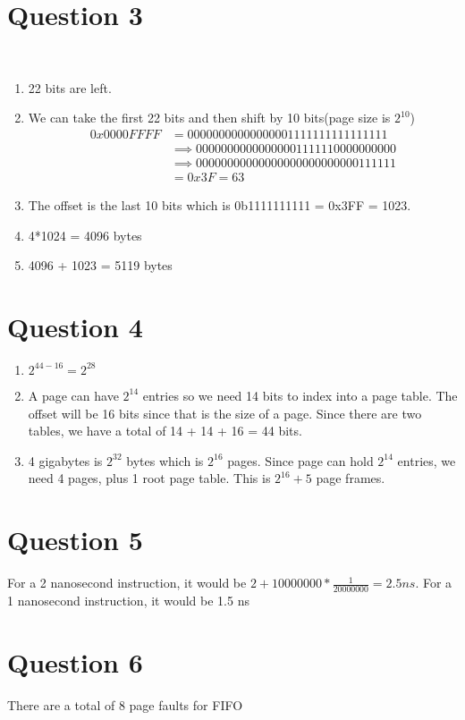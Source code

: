 \documentclass{article}
\begin{document}
\section*{Question 3}\
\begin{enumerate}
    \item 22 bits are left.
    \item We can take the first 22 bits and then shift by 10 bits(page size is $2^{10}$)
    \begin{align*}
        0x0000FFFF &= 0000 0000 0000 0000 1111 1111 1111 1111 \\
        &\implies     0000 0000 0000 0000 1111 1100 0000 0000 \\
        &\implies     0000 0000 0000 0000 0000 0000 0011 1111 \\
        &= 0x3F = 63
    \end{align*}
    \item The offset is the last 10 bits which is 0b1111111111 = 0x3FF = 1023.
    \item 4*1024 = 4096 bytes 
    \item 4096 + 1023 = 5119 bytes
\end{enumerate}

\section*{Question 4}
\begin{enumerate}
    \item $2^{44-16} = 2^{28}$
    \item A page can have $2^14$ entries so we need 14 bits to index into a page table.
    The offset will be 16 bits since that is the size of a page.
    Since there are two tables, we have a total of 14 + 14 + 16 = 44 bits.
    \item 4 gigabytes is $2^32$ bytes which is $2^16$ pages.
    Since page can hold $2^14$ entries, we need 4 pages, plus 1 root page table.
    This is $2^16+5$ page frames.
\end{enumerate}

\section*{Question 5}
For a 2 nanosecond instruction, it would be $2+10000000*\frac{1}{20000000} = 2.5 ns$.
For a 1 nanosecond instruction, it would be 1.5 ns

\section*{Question 6}
There are a total of 8 page faults for FIFO
\end{document}

